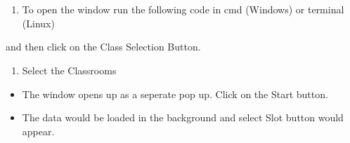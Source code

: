 \documentclass[letterpaper,10pt,english]{sphinxmanual}
\begin{document}


\section{}
\label{\detokenize{user_manual:working-in-gui-3}}

\subsection{}
\label{\detokenize{user_manual:id5}}
\begin{enumerate}
%
\item {} 
To open the window run the following code in cmd (Windows) or terminal (Linux)

\end{enumerate}

\begin{sphinxVerbatim}[commandchars=\\\{\}]
 
\end{sphinxVerbatim}

and then click on the Class Selection Button.
\begin{enumerate}
%
\setcounter{enumi}{1}
\item {} 
Select the Classrooms

\end{enumerate}
\begin{itemize}
\item {} 
The window opens up as a seperate pop up. Click on the Start button.

\end{itemize}

\begin{itemize}
\item {} 
The data would be loaded in the background and select Slot button would appear.

\end{itemize}
\end{document}
